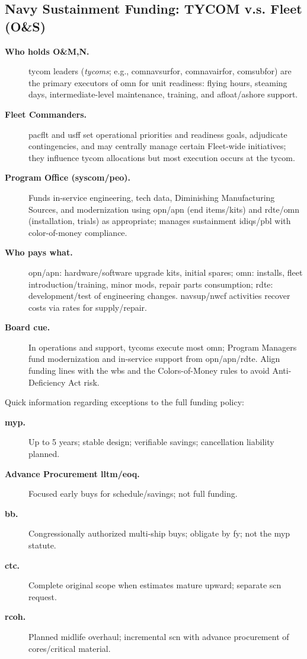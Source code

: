 \documentclass[../main.tex]{subfiles}
\begin{document}
\subsection{Navy Sustainment Funding: TYCOM v.s. Fleet (O\&S)}
\begin{description}
  \item[\textbf{Who holds O\&M,N.}] \ac{tycom} leaders (\emph{\acp{tycom}}; e.g., \ac{comnavsurfor}, \ac{comnavairfor}, \ac{comsubfor}) are the primary executors of \ac{omn} for unit readiness: flying hours, steaming days, intermediate-level maintenance, training, and afloat/ashore support.
  \item[\textbf{Fleet Commanders.}] \ac{pacflt} and \ac{usff} set operational priorities and readiness goals, adjudicate contingencies, and may centrally manage certain Fleet-wide initiatives; they influence \ac{tycom} allocations but most execution occurs at the \ac{tycom}.
  \item[\textbf{Program Office (\ac{syscom}/\ac{peo}).}] Funds in-service engineering, tech data, Diminishing Manufacturing Sources, and modernization using \ac{opn}/\ac{apn} (end items/kits) and \ac{rdte}/\ac{omn} (installation, trials) as appropriate; manages sustainment \acp{idiq}/\ac{pbl} with color-of-money compliance.
  \item[\textbf{Who pays what.}] \ac{opn}/\ac{apn}: hardware/software upgrade kits, initial spares; \ac{omn}: installs, fleet introduction/training, minor mods, repair parts consumption; \ac{rdte}: development/test of engineering changes. \ac{navsup}/\ac{nwcf} activities recover costs via rates for supply/repair.
  \item[\textbf{Board cue.}] In operations and support, \acp{tycom} execute most \ac{omn}; Program Managers fund modernization and in-service support from \ac{opn}/\ac{apn}/\ac{rdte}. Align funding lines with the \ac{wbs} and the Colors-of-Money rules to avoid Anti-Deficiency Act risk.
\end{description}

Quick information regarding exceptions to the full funding policy:
\begin{description}
  \item[\textbf{\ac{myp}.}] Up to 5 years; stable design; verifiable savings; cancellation liability planned.
  \item[\textbf{Advance Procurement \ac{lltm}/\ac{eoq}.}] Focused early buys for schedule/savings; not full funding.
  \item[\textbf{\ac{bb}.}] Congressionally authorized multi-ship buys; obligate by \ac{fy}; not the \ac{myp} statute.
  \item[\textbf{\ac{ctc}.}] Complete original scope when estimates mature upward; separate \ac{scn} request.
  \item[\textbf{\ac{rcoh}.}] Planned midlife overhaul; incremental \ac{scn} with advance procurement of cores/critical material.
\end{description}
\end{document}
